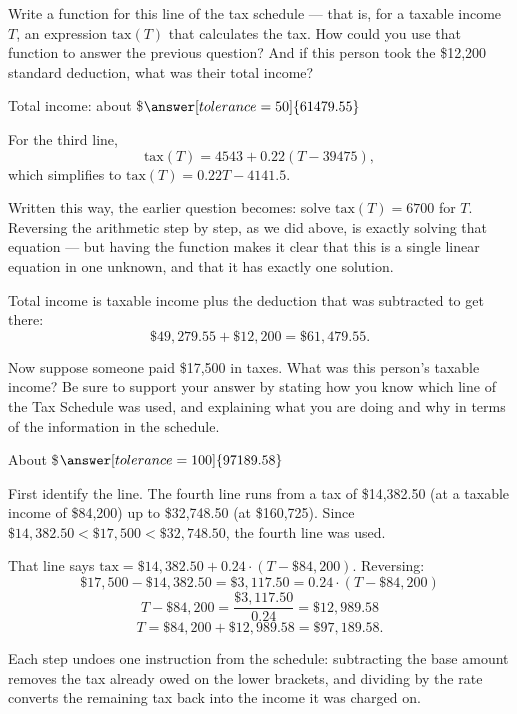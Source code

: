 \documentclass[12pt]{ximera}
\begin{document}
\begin{problem}
Write a function for this line of the tax schedule --- that is, for a taxable income
$T$, an expression $\text{tax}(T)$ that calculates the tax. How could you use that
function to answer the previous question? And if this person took the \$12,200 standard
deduction, what was their total income?

Total income: about \$$\answer[tolerance=50]{61479.55}$

\begin{freeResponse}
\end{freeResponse}

\begin{solution}
For the third line,
\[
\text{tax}(T) = 4543 + 0.22(T - 39475),
\]
which simplifies to $\text{tax}(T) = 0.22T - 4141.5$.

Written this way, the earlier question becomes: solve $\text{tax}(T) = 6700$ for $T$.
Reversing the arithmetic step by step, as we did above, is exactly solving that
equation --- but having the function makes it clear that this is a single linear
equation in one unknown, and that it has exactly one solution.

Total income is taxable income plus the deduction that was subtracted to get there:
\[
\$49{,}279.55 + \$12{,}200 = \$61{,}479.55.
\]
\end{solution}
\end{problem}

\begin{problem}
Now suppose someone paid \$17,500 in taxes. What was this person's taxable income? Be
sure to support your answer by stating how you know which line of the Tax Schedule was
used, and explaining what you are doing and why in terms of the information in the
schedule.

About \$$\answer[tolerance=100]{97189.58}$

\begin{freeResponse}
\end{freeResponse}

\begin{solution}
First identify the line. The fourth line runs from a tax of \$14,382.50 (at a taxable
income of \$84,200) up to \$32,748.50 (at \$160,725). Since
$\$14{,}382.50 < \$17{,}500 < \$32{,}748.50$, the fourth line was used.

That line says $\text{tax} = \$14{,}382.50 + 0.24 \cdot (T - \$84{,}200)$. Reversing:
\[
\$17{,}500 - \$14{,}382.50 = \$3{,}117.50 = 0.24 \cdot (T - \$84{,}200)
\]
\[
T - \$84{,}200 = \frac{\$3{,}117.50}{0.24} = \$12{,}989.58
\]
\[
T = \$84{,}200 + \$12{,}989.58 = \$97{,}189.58.
\]

Each step undoes one instruction from the schedule: subtracting the base amount removes
the tax already owed on the lower brackets, and dividing by the rate converts the
remaining tax back into the income it was charged on.
\end{solution}
\end{problem}
\end{document}
